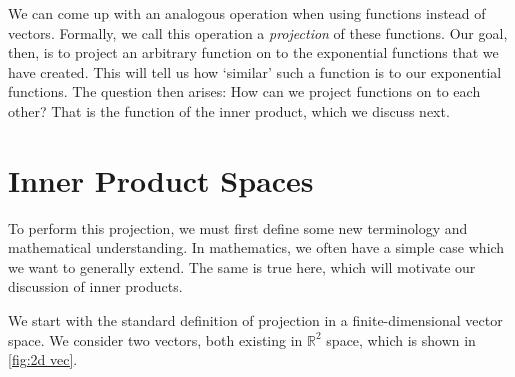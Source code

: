 We can come up with an analogous operation when using functions instead of vectors. Formally, we call this operation a \textit{projection} of these functions. Our goal, then, is to project an arbitrary function on to the exponential functions that we have created. This will tell us how `similar' such a function is to our exponential functions. The question then arises: How can we project functions on to each other? That is the function of the inner product, which we discuss next.

\section{Inner Product Spaces}\label{sec: inner prod}
To perform this projection, we must first define some new terminology and mathematical understanding. In mathematics, we often have a simple case which we want to generally extend. The same is true here, which will motivate our discussion of inner products.

We start with the standard definition of projection in a finite-dimensional vector space. We consider two vectors, both existing in $\mathbb{R}^2$ space, which is shown in \autoref{fig:2d vec}.


